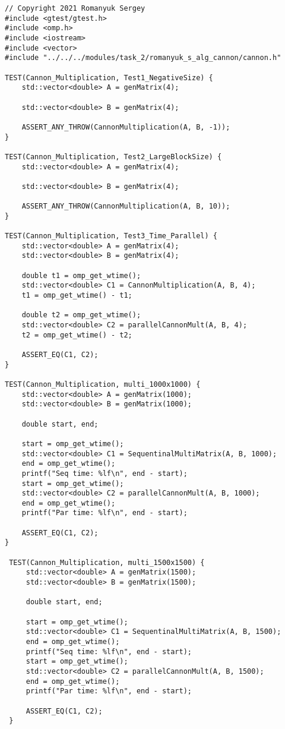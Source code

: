 \documentclass{report}
\begin{document}
\begin{lstlisting}
// Copyright 2021 Romanyuk Sergey
#include <gtest/gtest.h>
#include <omp.h>
#include <iostream>
#include <vector>
#include "../../../modules/task_2/romanyuk_s_alg_cannon/cannon.h"

TEST(Cannon_Multiplication, Test1_NegativeSize) {
    std::vector<double> A = genMatrix(4);

    std::vector<double> B = genMatrix(4);

    ASSERT_ANY_THROW(CannonMultiplication(A, B, -1));
}

TEST(Cannon_Multiplication, Test2_LargeBlockSize) {
    std::vector<double> A = genMatrix(4);

    std::vector<double> B = genMatrix(4);

    ASSERT_ANY_THROW(CannonMultiplication(A, B, 10));
}

TEST(Cannon_Multiplication, Test3_Time_Parallel) {
    std::vector<double> A = genMatrix(4);
    std::vector<double> B = genMatrix(4);

    double t1 = omp_get_wtime();
    std::vector<double> C1 = CannonMultiplication(A, B, 4);
    t1 = omp_get_wtime() - t1;

    double t2 = omp_get_wtime();
    std::vector<double> C2 = parallelCannonMult(A, B, 4);
    t2 = omp_get_wtime() - t2;

    ASSERT_EQ(C1, C2);
}

TEST(Cannon_Multiplication, multi_1000x1000) {
    std::vector<double> A = genMatrix(1000);
    std::vector<double> B = genMatrix(1000);

    double start, end;

    start = omp_get_wtime();
    std::vector<double> C1 = SequentinalMultiMatrix(A, B, 1000);
    end = omp_get_wtime();
    printf("Seq time: %lf\n", end - start);
    start = omp_get_wtime();
    std::vector<double> C2 = parallelCannonMult(A, B, 1000);
    end = omp_get_wtime();
    printf("Par time: %lf\n", end - start);

    ASSERT_EQ(C1, C2);
}

 TEST(Cannon_Multiplication, multi_1500x1500) {
     std::vector<double> A = genMatrix(1500);
     std::vector<double> B = genMatrix(1500);

     double start, end;

     start = omp_get_wtime();
     std::vector<double> C1 = SequentinalMultiMatrix(A, B, 1500);
     end = omp_get_wtime();
     printf("Seq time: %lf\n", end - start);
     start = omp_get_wtime();
     std::vector<double> C2 = parallelCannonMult(A, B, 1500);
     end = omp_get_wtime();
     printf("Par time: %lf\n", end - start);

     ASSERT_EQ(C1, C2);
 }
\end{lstlisting}
\end{document}
